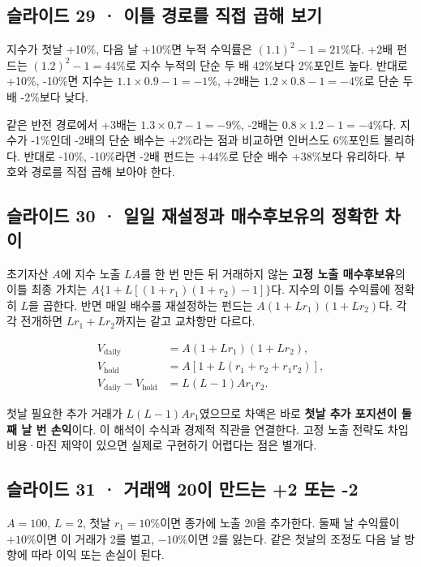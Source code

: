 \documentclass[11pt,a4paper]{article}
\begin{document}
\subsection{슬라이드 29 · 이틀 경로를 직접 곱해 보기}
지수가 첫날 +10\%, 다음 날 +10\%면 누적 수익률은 $(1.1)^2-1=21\%$다. +2배 펀드는 $(1.2)^2-1=44\%$로 지수 누적의 단순 두 배 42\%보다 2\%포인트 높다. 반대로 +10\%, -10\%면 지수는 $1.1\times0.9-1=-1\%$, +2배는 $1.2\times0.8-1=-4\%$로 단순 두 배 -2\%보다 낮다.\par

같은 반전 경로에서 +3배는 $1.3\times0.7-1=-9\%$, -2배는 $0.8\times1.2-1=-4\%$다. 지수가 -1\%인데 -2배의 단순 배수는 +2\%라는 점과 비교하면 인버스도 6\%포인트 불리하다. 반대로 -10\%, -10\%라면 -2배 펀드는 +44\%로 단순 배수 +38\%보다 유리하다. 부호와 경로를 직접 곱해 보아야 한다.\par

\subsection{슬라이드 30 · 일일 재설정과 매수후보유의 정확한 차이}
초기자산 $A$에 지수 노출 $LA$를 한 번 만든 뒤 거래하지 않는 \textbf{고정 노출 매수후보유}의 이틀 최종 가치는 $A\{1+L[(1+r_1)(1+r_2)-1]\}$다. 지수의 이틀 수익률에 정확히 $L$을 곱한다. 반면 매일 배수를 재설정하는 펀드는 $A(1+Lr_1)(1+Lr_2)$다. 각각 전개하면 $Lr_1+Lr_2$까지는 같고 교차항만 다르다.\par

\[
\begin{aligned}
V_{\mathrm{daily}}&=A(1+Lr_1)(1+Lr_2),\\
V_{\mathrm{hold}}&=A[1+L(r_1+r_2+r_1r_2)],\\
V_{\mathrm{daily}}-V_{\mathrm{hold}}&=L(L-1)Ar_1r_2.
\end{aligned}
\]

첫날 필요한 추가 거래가 $L(L-1)Ar_1$였으므로 차액은 바로 \textbf{첫날 추가 포지션이 둘째 날 번 손익}이다. 이 해석이 수식과 경제적 직관을 연결한다. 고정 노출 전략도 차입비용·마진 제약이 있으면 실제로 구현하기 어렵다는 점은 별개다.\par

\subsection{슬라이드 31 · 거래액 20이 만드는 +2 또는 -2}
$A=100$, $L=2$, 첫날 $r_1=10\%$이면 종가에 노출 20을 추가한다. 둘째 날 수익률이 $+10\%$이면 이 거래가 2를 벌고, $-10\%$이면 2를 잃는다. 같은 첫날의 조정도 다음 날 방향에 따라 이익 또는 손실이 된다.\par
\end{document}
